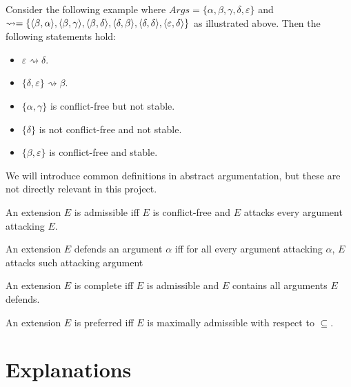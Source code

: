 Consider the following example where $Args=\{\alpha,\beta,\gamma,\delta,\varepsilon\}$ and $	\rightsquigarrow=\{
\langle{\beta},{\alpha}\rangle,\\
\langle{\beta},{\gamma}\rangle,
\langle{\beta},{\delta}\rangle,
\langle{\delta},{\beta}\rangle,
\langle{\delta},{\delta}\rangle,
\langle{\varepsilon},{\delta}\rangle
\}$ as illustrated above. Then the following statements hold:
\begin{itemize}
	\item $\varepsilon\rightsquigarrow\delta$.
	\item $\{\delta,\varepsilon\}\rightsquigarrow\beta$.
	\item $\{\alpha,\gamma\}$ is conflict-free but not stable.
	\item $\{\delta\}$ is not conflict-free and not stable.
	\item $\{\beta,\varepsilon\}$ is conflict-free and stable.
\end{itemize}

We will introduce common definitions in abstract argumentation, but these are not directly relevant in this project. 

\begin{definition}
	An extension $E$ is admissible iff $E$ is conflict-free and $E$ attacks every argument attacking $E$.
\end{definition}

\begin{definition}
	An extension $E$ defends an argument $\alpha$ iff for all every argument attacking $\alpha$, $E$ attacks such attacking argument 
\end{definition}

\begin{definition}
	An extension $E$ is complete iff $E$ is admissible and $E$ contains all arguments $E$ defends.
\end{definition}

\begin{definition}
	An extension $E$ is preferred iff $E$ is maximally admissible with respect to $\subseteq$.
\end{definition}

\section{Explanations}

